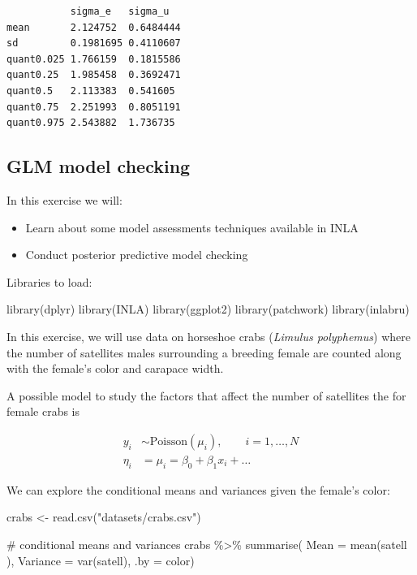 \documentclass[
  letterpaper,
  DIV=11,
  numbers=noendperiod]{scrartcl}
\newenvironment{Shaded}{\begin{snugshade}}{\end{snugshade}}
\newcommand{\AttributeTok}[1]{\textcolor[rgb]{0.40,0.45,0.13}{#1}}
\newcommand{\CommentTok}[1]{\textcolor[rgb]{0.37,0.37,0.37}{#1}}
\newcommand{\FunctionTok}[1]{\textcolor[rgb]{0.28,0.35,0.67}{#1}}
\newcommand{\NormalTok}[1]{\textcolor[rgb]{0.00,0.23,0.31}{#1}}
\newcommand{\OtherTok}[1]{\textcolor[rgb]{0.00,0.23,0.31}{#1}}
\newcommand{\SpecialCharTok}[1]{\textcolor[rgb]{0.37,0.37,0.37}{#1}}
\newcommand{\StringTok}[1]{\textcolor[rgb]{0.13,0.47,0.30}{#1}}
\providecommand{\tightlist}{%
  \setlength{\itemsep}{0pt}\setlength{\parskip}{0pt}}\usepackage{longtable,booktabs,array}
\begin{document}
\begin{tcolorbox}
\begin{verbatim}
           sigma_e   sigma_u  
mean       2.124752  0.6484444
sd         0.1981695 0.4110607
quant0.025 1.766159  0.1815586
quant0.25  1.985458  0.3692471
quant0.5   2.113383  0.541605 
quant0.75  2.251993  0.8051191
quant0.975 2.543882  1.736735 
\end{verbatim}

\end{tcolorbox}

\subsection{GLM model checking}\label{sec-linmodel}

In this exercise we will:

\begin{itemize}
\tightlist
\item
  Learn about some model assessments techniques available in INLA
\item
  Conduct posterior predictive model checking
\end{itemize}

Libraries to load:

\begin{Shaded}
\begin{Highlighting}[]
\FunctionTok{library}\NormalTok{(dplyr)}
\FunctionTok{library}\NormalTok{(INLA)}
\FunctionTok{library}\NormalTok{(ggplot2)}
\FunctionTok{library}\NormalTok{(patchwork)}
\FunctionTok{library}\NormalTok{(inlabru)     }
\end{Highlighting}
\end{Shaded}

In this exercise, we will use data on horseshoe crabs (\emph{Limulus
polyphemus}) where the number of satellites males surrounding a breeding
female are counted along with the female's color and carapace width.

A possible model to study the factors that affect the number of
satellites the for female crabs is

\[
\begin{aligned}
y_i&\sim\mathrm{Poisson}(\mu_i), \qquad i = 1,\dots,N \\
\eta_i &= \mu_i = \beta_0 + \beta_1 x_i + \ldots
\end{aligned}
\]

We can explore the conditional means and variances given the female's
color:

\begin{Shaded}
\begin{Highlighting}[]
\NormalTok{crabs }\OtherTok{\textless{}{-}} \FunctionTok{read.csv}\NormalTok{(}\StringTok{"datasets/crabs.csv"}\NormalTok{)}

\CommentTok{\# conditional means and variances}
\NormalTok{crabs }\SpecialCharTok{\%\textgreater{}\%}
  \FunctionTok{summarise}\NormalTok{( }\AttributeTok{Mean =} \FunctionTok{mean}\NormalTok{(satell ),}
             \AttributeTok{Variance =} \FunctionTok{var}\NormalTok{(satell),}
                     \AttributeTok{.by =}\NormalTok{ color)}
\end{Highlighting}
\end{Shaded}
\end{document}
